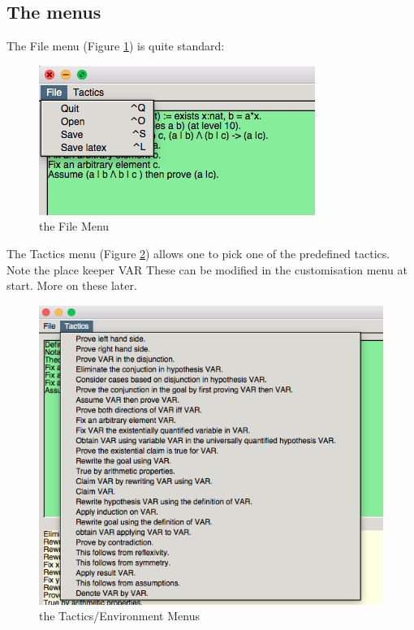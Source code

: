 \subsection{The menus}

The File menu (Figure \ref{file}) is quite standard:

\begin{figure}[h!]
\includegraphics[scale=0.5]{Installation/menu1.png}


\caption{the File  Menu}\label{file}
\end{figure}

The Tactics menu (Figure \ref{tactics}) allows one to pick one of the predefined tactics. 
Note the place keeper VAR
These can be modified in the customisation menu at start. More on these later.

\begin{figure}[h!]
\includegraphics[scale=0.5]{Installation/menu2.png}


\caption{the Tactics/Environment Menus}\label{tactics}
\end{figure}
